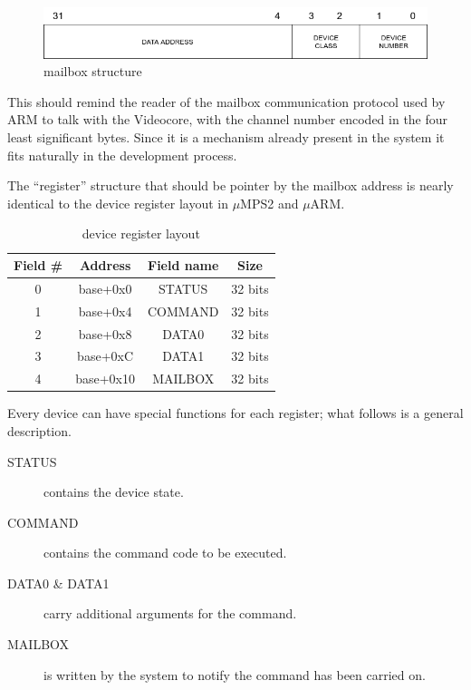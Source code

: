 \documentclass[12pt,a4paper,openright,twoside]{report}
\begin{document}
\begin{figure}[h]
\includegraphics[scale=0.571]{tesi5.png}
\caption[Figure 5]{mailbox structure}\label{fig:mailbox}
\end{figure}

This should remind the reader of the mailbox communication protocol used by ARM
to talk with the Videocore, with the channel number encoded in the four least significant
bytes. Since it is a mechanism already present in the system it fits naturally
in the development process.

The ``register'' structure that should be pointer by the mailbox address is nearly 
identical to the device register layout in $\mu$MPS2 and $\mu$ARM.

\begin{table}[h]
\begin{center}
    \begin{tabular}{|c|c|c|c|}
    \hline
    \rowcolor[HTML]{C0C0C0} 
    Field \# & Address   & Field name & Size    \\ \hline
    0        & base+0x0  & STATUS     & 32 bits \\ \hline
    1        & base+0x4  & COMMAND    & 32 bits \\ \hline
    2        & base+0x8  & DATA0      & 32 bits \\ \hline
    3        & base+0xC  & DATA1      & 32 bits \\ \hline
    4        & base+0x10 & MAILBOX    & 32 bits \\ \hline
    \end{tabular}
 \caption[Table 1]{device register layout}\label{tab:reg}
\end{center}
\end{table}

Every device can have special functions for each register; what follows is a
general description.
\begin{description}
    \item[STATUS] contains the device state.
    \item[COMMAND] contains the command code to be executed.
    \item[DATA0 \& DATA1] carry additional arguments for the command.
    \item[MAILBOX] is written by the system to notify the command has been carried on.
\end{description}
\end{document}
